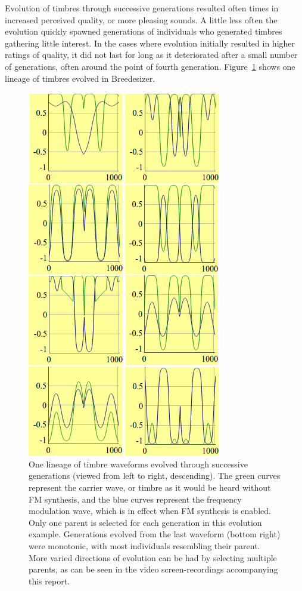 \documentclass[conference]{IEEEtran}
\begin{document}
Evolution of timbres through successive generations resulted often times in increased perceived quality, or more pleasing sounds.  A little less often the evolution quickly spawned generations of individuals who generated timbres gathering little interest.  In the cases where evolution initially resulted in higher ratings of quality, it did not last for long as it deteriorated after a small number of generations, often around the point of fourth generation.  Figure~\ref{fig:timbreLineage} shows one lineage of timbres evolved in Breedesizer.

\begin{figure}[htp]
	\centerline{\includegraphics[width=.8\columnwidth]{breedesizerLineage.png}}
	\caption{One lineage of timbre waveforms evolved through successive generations (viewed from left to right, descending).  The green curves represent the carrier wave, or timbre as it would be heard without FM synthesis, and the blue curves represent the frequency modulation wave, which is in effect when FM synthesis is enabled.  Only one parent is selected for each generation in this evolution example.  Generations evolved from the last waveform (bottom right) were monotonic, with most individuals resembling their parent.  More varied directions of evolution can be had by selecting multiple parents, as can be seen in the video screen-recordings accompanying this report.}
	\label{fig:timbreLineage}
\end{figure}
\end{document}
